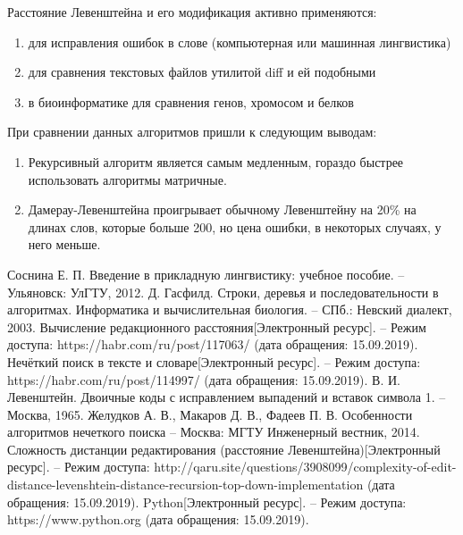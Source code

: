 \documentclass[a4paper,14pt]{article} %
\begin{document}
	Расстояние Левенштейна и его модификация активно применяются:
	\begin{enumerate}
		\item для исправления ошибок в слове (компьютерная или машинная лингвистика)
		\item для сравнения текстовых файлов утилитой diff и ей подобными
		\item в биоинформатике для сравнения генов, хромосом и белков
	\end{enumerate}
	
	\hfill
	
	При сравнении данных алгоритмов пришли к следующим выводам:
	\begin{enumerate}
 		\item Рекурсивный алгоритм является самым медленным, гораздо быстрее использовать алгоритмы матричные.   \\
 		\item Дамерау-Левенштейна проигрывает обычному Левенштейну на 20\% на длинах слов, которые больше 200, но цена ошибки, в некоторых случаях, у него меньше.\\
	\end{enumerate}

 	\newpage

        \begin{thebibliography}{}
        		\bibitem{} Соснина Е. П. Введение в прикладную лингвистику: учебное пособие. -- Ульяновск: УлГТУ, 2012.
		\bibitem{} Д. Гасфилд. Строки, деревья и последовательности в алгоритмах. Информатика и вычислительная биология. -- СПб.: Невский диалект, 2003.
		\bibitem{} Вычисление редакционного расстояния[Электронный ресурс]. -- Режим доступа: https://habr.com/ru/post/117063/ (дата обращения: 15.09.2019).
		\bibitem{} Нечёткий поиск в тексте и словаре[Электронный ресурс]. -- Режим доступа: https://habr.com/ru/post/114997/ (дата обращения: 15.09.2019).
		\bibitem{} В. И. Левенштейн. Двоичные коды с исправлением выпадений и вставок символа 1. -- Москва, 1965. 
		\bibitem{} Желудков А. В., Макаров Д. В., Фадеев П. В. Особенности алгоритмов нечеткого поиска -- Москва: МГТУ Инженерный вестник, 2014. 
		\bibitem{} Сложность дистанции редактирования (расстояние Левенштейна)[Электронный ресурс]. -- Режим доступа: http://qaru.site/questions/3908099/complexity-of-edit-distance-levenshtein-distance-recursion-top-down-implementation (дата обращения: 15.09.2019).
		\bibitem{} Python[Электронный ресурс]. -- Режим доступа: https://www.python.org (дата обращения: 15.09.2019).
	\end{thebibliography} 
\end{document}
